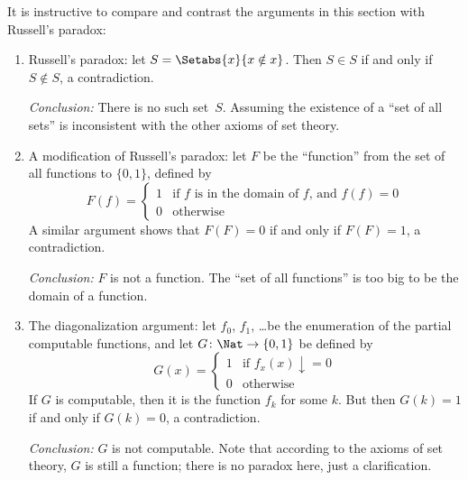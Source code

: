 \documentclass[../../../include/open-logic-section]{subfiles}
\begin{document}

It is instructive to compare and contrast the arguments in
this section with Russell's paradox:
\begin{enumerate}
\item Russell's paradox: let $S = \Setabs{x}{x \notin x}$. Then $S
  \in S$ if and only if $S \notin S$, a contradiction.

  \emph{Conclusion:} There is no such set~$S$. Assuming the existence of a
  ``set of all sets'' is inconsistent with the other axioms of set
  theory.

\item A modification of Russell's paradox: let $F$ be the ``function''
  from the set of all functions to $\{ 0, 1 \}$, defined by
  \[
  F(f) =
  \begin{cases}
    1 & \text{if $f$ is in the domain of $f$, and $f(f) = 0$} \\
    0 & \text{otherwise}
  \end{cases}
  \]
  A similar argument shows that $F(F) = 0$ if and only if $F(F) = 1$,
  a contradiction.

  \emph{Conclusion:} $F$ is not a function. The ``set of all
  functions'' is too big to be the domain of a function.

\item The diagonalization argument: let $f_0$, $f_1$, \dots be the
  enumeration of the partial computable functions, and let $G \colon \Nat \to
  \{ 0, 1 \}$ be defined by
  \[
  G(x) =
  \begin{cases}
    1 & \text{if $f_x(x)\downarrow = 0$} \\
    0 & \text{otherwise}
  \end{cases}
  \]
  If $G$ is computable, then it is the function $f_k$ for some
  $k$. But then $G(k) = 1$ if and only if $G(k) = 0$, a contradiction.

  \emph{Conclusion:} $G$ is not computable. Note that according to the
  axioms of set theory, $G$ is still a function; there is no paradox
  here, just a clarification.
\end{enumerate}
\end{document}
